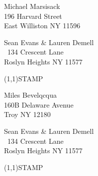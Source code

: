 \documentclass[12pt]{article}
\begin{document}
\begin{center} \begin{Huge} \vspace*{\fill}
Michael Marsisack\\
196 Harvard Street\\
East Williston NY 11596\\
\vspace{\fill} \end{Huge} \end{center}

\clearpage

\begin{minipage}{.5\linewidth} \noindent
Sean Evans \& Lauren Demell\\\ 
134 Crescent Lane\\ 
Roslyn Heights NY 11577
\end{minipage}
\begin{minipage}{.5\linewidth \hspace{-.2in} \vspace{-.3in}}
\begin{flushright}
\framebox(1,1){STAMP}
\end{flushright}
\end{minipage}

\begin{center} \begin{Huge} \vspace*{\fill}
Miles Bevelqcqua\\
160B Delaware Avenue\\
Troy NY 12180\\
\vspace{\fill} \end{Huge} \end{center}

\clearpage

\begin{minipage}{.5\linewidth} \noindent
Sean Evans \& Lauren Demell\\\ 
134 Crescent Lane\\ 
Roslyn Heights NY 11577
\end{minipage}
\begin{minipage}{.5\linewidth \hspace{-.2in} \vspace{-.3in}}
\begin{flushright}
\framebox(1,1){STAMP}
\end{flushright}
\end{minipage}
\end{document}

